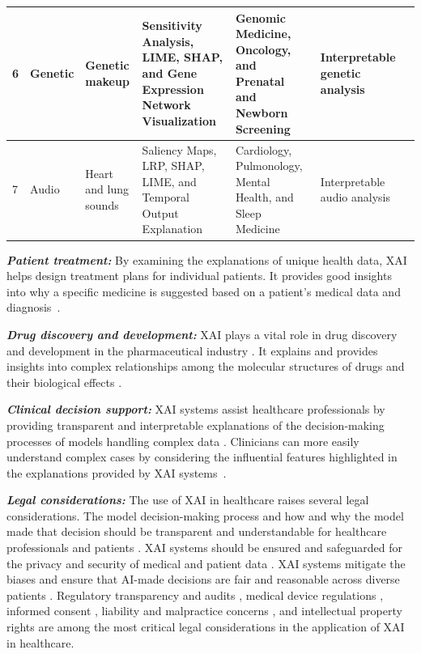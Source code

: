 \documentclass[final,5p,times,twocolumn]{elsarticle}
\begin{document}
\begin{table}[h]
\begin{center}
\begin{tabular}{m{10pt}|m{40pt}|m{70pt}|m{90pt}|m{105pt}|m{50pt}|m{55pt}}
        6& Genetic & Genetic makeup & Sensitivity Analysis, LIME, SHAP, and Gene Expression Network Visualization & Genomic Medicine, Oncology, and Prenatal and Newborn Screening & Interpretable genetic analysis & \cite{awotunde2022explainable, anguita2020explainable} \\  \hline 
        
        7&  Audio & Heart and lung sounds & Saliency Maps, LRP, SHAP, LIME, and Temporal Output Explanation & Cardiology, Pulmonology, Mental Health, and Sleep Medicine & Interpretable audio analysis & \cite{troncoso2022explainable, tjoa2020survey} \\  \hline			
\end{tabular}
\end{center}  
\end{table}



\textbf{ \textit{Patient treatment:}} %
By examining the explanations of unique health data, XAI helps design treatment plans for individual patients. It provides good insights into why a specific medicine is suggested based on a patient's medical data and diagnosis~\cite{liao2023artificial}.

\textbf{ \textit{Drug discovery and development:}} XAI plays a vital role in drug discovery and development in the pharmaceutical industry \cite{askr2023deep}. It explains and provides insights into complex relationships among the molecular structures of drugs and their biological effects \cite{kha2023development}.
    
\textbf{ \textit{Clinical decision support:}} XAI systems assist healthcare professionals by providing transparent and interpretable explanations of the decision-making processes of models handling complex data \cite{panigutti2023co}. Clinicians can more easily understand complex cases by considering the influential features highlighted in the explanations provided by XAI systems~\cite{loh2022application}.

\textbf{ \textit{Legal considerations:}} The use of XAI in healthcare raises several legal considerations. The model decision-making process and how and why the model made that decision should be transparent and understandable for healthcare professionals and patients \cite{albahri2023systematic}. XAI systems should be ensured and safeguarded for the privacy and security of medical and patient data \cite{saraswat2022explainable}. XAI systems mitigate the biases and ensure that AI-made decisions are fair and reasonable across diverse patients \cite{albahri2023systematic}. Regulatory transparency and audits \cite{ward2020machine}, medical device regulations \cite{ma2021understanding}, informed consent \cite{sharma2022artificial}, liability and malpractice concerns \cite{maliha2021artificial}, and intellectual property rights \cite{alam2023explainable} are among the most critical legal considerations in the application of XAI in healthcare.
\end{document}
